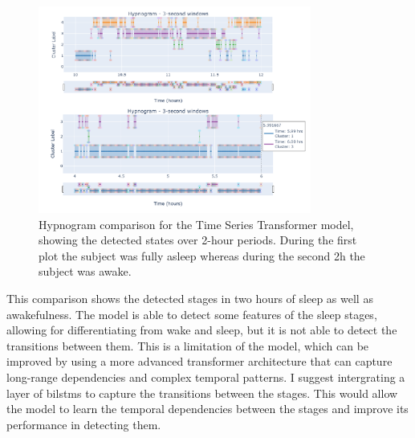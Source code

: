\documentclass[a4paper,12pt,twoside]{article}
\begin{document}
\begin{figure}[H]
\centering
\includegraphics[width=0.8\textwidth]{img/tst hypnogram comparison sleep awake.png}
\caption{Hypnogram comparison for the Time Series Transformer model, showing the detected states over 2-hour periods. During the first plot the subject was fully asleep whereas during the second 2h the subject was awake.}
\label{fig:tst_hypnogram_comparison}
\end{figure}

This comparison shows the detected stages in two hours of sleep as well as awakefulness. The model is able to detect some features of the sleep stages, allowing for differentiating from wake and sleep, but it is not able to detect the transitions between them. This is a limitation of the model, which can be improved by using a more advanced transformer architecture that can capture long-range dependencies and complex temporal patterns. I suggest intergrating a layer of bilstms to capture the transitions between the stages. This would allow the model to learn the temporal dependencies between the stages and improve its performance in detecting them.
\end{document}
